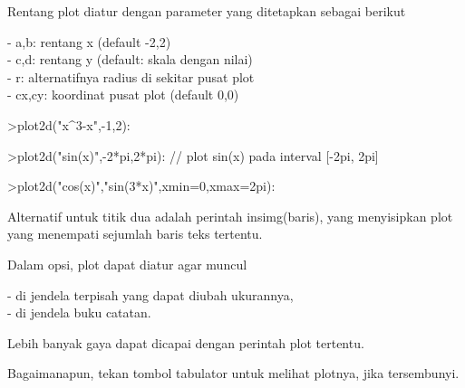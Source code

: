 \documentclass[a4paper,10pt]{article}
\begin{document}
\begin{eulernotebook}
\begin{eulercomment}
\begin{eulercomment}
\begin{eulercomment}
\begin{eulercomment}
\begin{eulercomment}
Rentang plot diatur dengan parameter yang ditetapkan sebagai berikut

- a,b: rentang x (default -2,2)\\
- c,d: rentang y (default: skala dengan nilai)\\
- r: alternatifnya radius di sekitar pusat plot\\
- cx,cy: koordinat pusat plot (default 0,0)
\end{eulercomment}
\begin{eulerprompt}
>plot2d("x^3-x",-1,2):
\end{eulerprompt}
\begin{eulerprompt}
>plot2d("sin(x)",-2*pi,2*pi): // plot sin(x) pada interval [-2pi, 2pi]
\end{eulerprompt}
\begin{eulerprompt}
>plot2d("cos(x)","sin(3*x)",xmin=0,xmax=2pi):
\end{eulerprompt}
\begin{eulercomment}
Alternatif untuk titik dua adalah perintah insimg(baris), yang
menyisipkan plot yang menempati sejumlah baris teks tertentu.

Dalam opsi, plot dapat diatur agar muncul

- di jendela terpisah yang dapat diubah ukurannya,\\
- di jendela buku catatan.

Lebih banyak gaya dapat dicapai dengan perintah plot tertentu.

Bagaimanapun, tekan tombol tabulator untuk melihat plotnya, jika
tersembunyi.


\end{eulercomment}
\end{eulercomment}
\end{eulercomment}
\end{eulercomment}
\end{eulercomment}
\end{eulernotebook}
\end{document}
